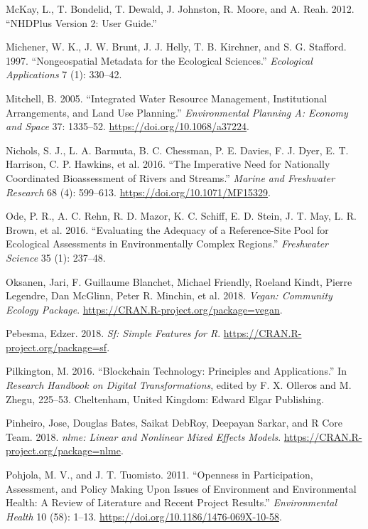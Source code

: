 \documentclass[fleqn,10pt,lineno]{wlpeerj} %
\begin{document}
\leavevmode\hypertarget{ref-McKay12}{}%
McKay, L., T. Bondelid, T. Dewald, J. Johnston, R. Moore, and A. Reah. 2012. ``NHDPlus Version 2: User Guide.''

\leavevmode\hypertarget{ref-Michener97}{}%
Michener, W. K., J. W. Brunt, J. J. Helly, T. B. Kirchner, and S. G. Stafford. 1997. ``Nongeospatial Metadata for the Ecological Sciences.'' \emph{Ecological Applications} 7 (1): 330--42.

\leavevmode\hypertarget{ref-Mitchell05}{}%
Mitchell, B. 2005. ``Integrated Water Resource Management, Institutional Arrangements, and Land Use Planning.'' \emph{Environmental Planning A: Economy and Space} 37: 1335--52. \url{https://doi.org/10.1068/a37224}.

\leavevmode\hypertarget{ref-Nichols16}{}%
Nichols, S. J., L. A. Barmuta, B. C. Chessman, P. E. Davies, F. J. Dyer, E. T. Harrison, C. P. Hawkins, et al. 2016. ``The Imperative Need for Nationally Coordinated Bioassessment of Rivers and Streams.'' \emph{Marine and Freshwater Research} 68 (4): 599--613. \url{https://doi.org/10.1071/MF15329}.

\leavevmode\hypertarget{ref-Ode16}{}%
Ode, P. R., A. C. Rehn, R. D. Mazor, K. C. Schiff, E. D. Stein, J. T. May, L. R. Brown, et al. 2016. ``Evaluating the Adequacy of a Reference-Site Pool for Ecological Assessments in Environmentally Complex Regions.'' \emph{Freshwater Science} 35 (1): 237--48.

\leavevmode\hypertarget{ref-Oksanen18}{}%
Oksanen, Jari, F. Guillaume Blanchet, Michael Friendly, Roeland Kindt, Pierre Legendre, Dan McGlinn, Peter R. Minchin, et al. 2018. \emph{Vegan: Community Ecology Package}. \url{https://CRAN.R-project.org/package=vegan}.

\leavevmode\hypertarget{ref-Pebesma18}{}%
Pebesma, Edzer. 2018. \emph{Sf: Simple Features for R}. \url{https://CRAN.R-project.org/package=sf}.

\leavevmode\hypertarget{ref-Pilkington16}{}%
Pilkington, M. 2016. ``Blockchain Technology: Principles and Applications.'' In \emph{Research Handbook on Digital Transformations}, edited by F. X. Olleros and M. Zhegu, 225--53. Cheltenham, United Kingdom: Edward Elgar Publishing.

\leavevmode\hypertarget{ref-Pinheiro18}{}%
Pinheiro, Jose, Douglas Bates, Saikat DebRoy, Deepayan Sarkar, and R Core Team. 2018. \emph{nlme: Linear and Nonlinear Mixed Effects Models}. \url{https://CRAN.R-project.org/package=nlme}.

\leavevmode\hypertarget{ref-Pohjola11}{}%
Pohjola, M. V., and J. T. Tuomisto. 2011. ``Openness in Participation, Assessment, and Policy Making Upon Issues of Environment and Environmental Health: A Review of Literature and Recent Project Results.'' \emph{Environmental Health} 10 (58): 1--13. \url{https://doi.org/10.1186/1476-069X-10-58}.
\end{document}
